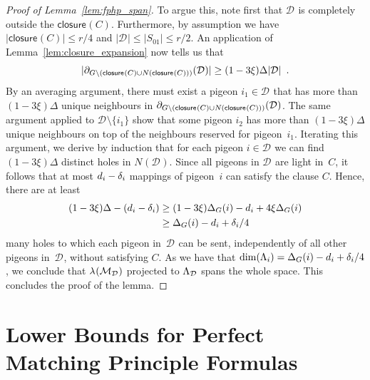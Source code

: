 \documentclass{article}
\providecommand{\abs}[1]{\lvert#1\rvert}
\newcommand{\boundary}[1]{\ensuremath{\partial #1}}
\newcommand{\set}[1]{\{ #1 \}}
\newcommand{\setsize}[1]{\lvert#1\rvert}
\newcommand{\eqperiod}{\enspace .}
\newcommand{\reflem}[1]{Lemma~\ref{#1}}
\newcommand{\light}{light\xspace}
\newcommand{\neigh}[2][]{N_{{#1}}(#2)}
\newcommand{\uniqueNeigh}[2][]{\boundary_{{#1}} ({#2})}
\renewcommand{\deg}[2][XXXXXXXXXXXX]{\Delta_{#1}(#2)}
\newcommand{\diff}{\xi}
\newcommand{\dimLi}{\deg[G]{i} - d_i + \delta_i/4}
\newcommand{\GdegMax}{\Delta}
\newcommand{\thr}[1]{ \ensuremath d_{{#1}} }
\newcommand{\adv}[1]{\delta_{{#1}}}
\newcommand{\linspace}[1][]{\ensuremath \Lambda_{{#1}}}
\newcommand{\linmap}[1][]{\ensuremath \lambda_{{#1}}}
\newcommand{\linmapof}[2][]{\linmap[#1](#2)}
\newcommand{\closure}[2][]{\mathsf{closure}_{{#1}}(#2)}
\newcommand{\diffclosure}[1][]{D_{{#1}}}
\renewcommand{\diffclosure}[1][]{\mathcal{D}_{{#1}}}
\newcommand{\matchings}[1][]{\ensuremath \mathcal{M}_{{#1}}}
\numberwithin{equation}{section}
\begin{document}
\begin{proof}[Proof of \reflem{lem:fphp_span}]
  
  To argue this, note first
  that $\diffclosure$ is completely outside the $\closure{C}$.
  Furthermore,
  by assumption we have
  $\setsize{\closure{C}} \leq  r/4$ and  
  $
  \setsize{ \diffclosure } 
  \leq
  \setsize{ S_{01} } 
  \leq 
  r/2
  $. 
  An application of
  \reflem{lem:closure_expansion} 
  now tells us that
  \begin{equation}
    \abs{ \uniqueNeigh[G \setminus (\closure{C} \cup \neigh{\closure{C}})]
      {\diffclosure} } \ge 
    (1 - 3 \diff) \GdegMax \setsize{\diffclosure} 
    \eqperiod
  \end{equation}    
  By an averaging argument,
  there must exist a pigeon $i_1 \in \diffclosure$
  that has more than $(1 - 3 \diff) \GdegMax$ 
  unique neighbours in 
  $\uniqueNeigh[G \setminus 
  (\closure{C} \cup \neigh{\closure{C}})]{\diffclosure}$.
  The same argument applied to   
  $\diffclosure \setminus \set{ i_1 }$
  show that some pigeon $i_2$
  has more than $(1 - 3 \diff) \GdegMax$ 
  unique neighbours on top of the neighbours reserved for
  pigeon~$i_1$.
  Iterating this argument, 
  we derive by induction that for each pigeon 
  $i \in \diffclosure$  we can find
  $(1 - 3 \diff) \GdegMax$ distinct holes
  in $\neigh{\diffclosure}$.
  Since all pigeons in  $\diffclosure$ are \light in~$C$, 
  it follows that at most $\thr{i} - \adv{i}$ mappings of pigeon~$i$
  can satisfy the clause $C$. Hence, there are at least
  \begin{align}
    (1 - 3 \diff) \GdegMax - (\thr{i} - \adv{i})
    &\geq 
      (1 - 3 \diff) \deg[G]{i} - \thr{i} + 4 \diff \deg[G]{i}
      \nonumber \\
    &\geq
      \deg[G]{i} - \thr{i} + \adv{i}/4
  \end{align}
  many holes to which  each pigeon in~$\diffclosure$
  can be sent, independently of all other pigeons in~$\diffclosure$,
  without satisfying $C$. As we 
  have that
  $\dim(\linspace[i]) = \dimLi$, we conclude that
  $\linmapof{\matchings[\diffclosure]}$ projected to
  $\linspace[\diffclosure]$ spans the whole space.
  This concludes the proof of the lemma.
\end{proof}


 

\newcommand{\closureconstant}{20}
\newcommand{\closureconplus}{28}

\section{Lower Bounds for 
  Perfect Matching Principle
    Formulas}
\label{sec:pm}
\end{document}
